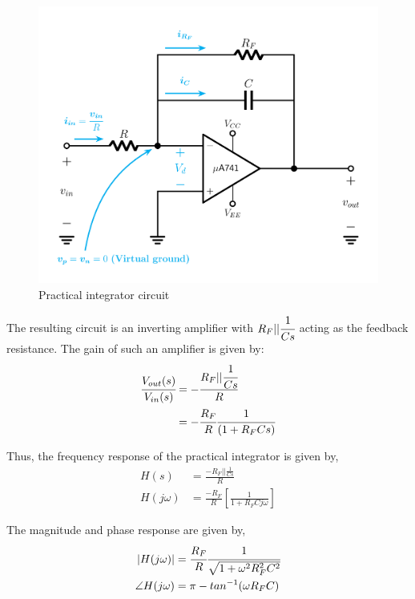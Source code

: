 \documentclass[12pt, titlepage]{article}
\theoremstyle{definition}
\begin{document}
    \begin{figure}[h]
      \centering
      \includegraphics[scale=0.23]{images/practical_integrator.png}
      \caption{Practical integrator circuit}
      \label{fig:theoretical_practical_integrator}
    \end{figure}

    The resulting circuit is an inverting amplifier with $R_F||\cfrac{1}{Cs}$ acting as the feedback resistance.
    The gain of such an amplifier is given by:
    \begin{align*}
      \cfrac{V_{out}(s)}{V_{in}(s)} &= - \cfrac{R_F||\cfrac{1}{Cs}}{R}\\
      &= - \cfrac{R_F}{R} \cfrac{1}{(1 + R_F Cs)}
    \end{align*}

    Thus, the frequency response of the practical integrator is given by,
    \begin{align}
      H(s) &= \frac{-R_{F} || \frac{1}{Cs}}{R} \\
      H(j\omega) &= \frac{-R_{F}}{R} \left[ \frac{1}{1+R_{F}Cj\omega} \right] \label{eq:freq_response}
    \end{align}

    The magnitude and phase response are given by,
    \begin{align*}
    |H(j\omega)| &= \cfrac{R_{F}}{R}\cfrac{1}{\sqrt{1+\omega^{2}R_{F}^{2}C^{2}}} \\
    \angle H(j\omega) &= \pi - tan^{-1}(\omega R_{F}C)
    \end{align*}
\end{document}
